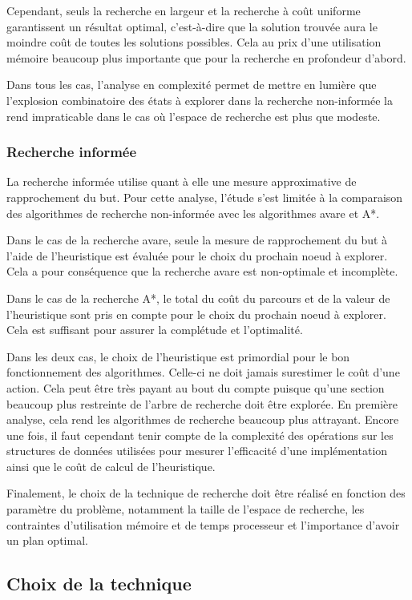 \documentclass[12pt,english,frenchb,letterpaper]{article}
\begin{document}
Cependant, seuls la recherche en largeur et la recherche à coût uniforme garantissent un résultat optimal, c'est-à-dire que la solution trouvée aura le moindre coût de toutes les solutions possibles. Cela au prix d'une utilisation mémoire beaucoup plus importante que pour la recherche en profondeur d'abord.

Dans tous les cas, l'analyse en complexité permet de mettre en lumière que l'explosion combinatoire des états à explorer dans la recherche non-informée la rend impraticable dans le cas où l'espace de recherche est plus que modeste.  

\subsubsection{Recherche informée}
La recherche informée utilise quant à elle une mesure approximative de rapprochement du but. Pour cette analyse, l'étude s'est limitée à la comparaison des algorithmes de recherche non-informée avec les algorithmes avare et A*.

Dans le cas de la recherche avare, seule la mesure de rapprochement du but à l'aide de l'heuristique est évaluée pour le choix du prochain noeud à explorer.  Cela a pour conséquence que la recherche avare est non-optimale et incomplète.

Dans le cas de la recherche A*, le total du coût du parcours et de la valeur de l'heuristique sont pris en compte pour le choix du prochain noeud à explorer.  Cela est suffisant pour assurer la complétude et l'optimalité.

Dans les deux cas, le choix de l'heuristique est primordial pour le bon fonctionnement des algorithmes.  Celle-ci ne doit jamais surestimer le coût d'une action.  Cela peut être très payant au bout du compte puisque qu'une section beaucoup plus restreinte de l'arbre de recherche doit être explorée.  En première analyse, cela rend les algorithmes de recherche beaucoup plus attrayant.  Encore une fois, il faut cependant tenir compte de la complexité des opérations sur les structures de données utilisées pour mesurer l'efficacité d'une implémentation ainsi que le coût de calcul de l'heuristique.  

Finalement, le choix de la technique de recherche doit être réalisé en fonction des paramètre du problème, notamment la taille de l'espace de recherche, les contraintes d'utilisation mémoire et de temps processeur et l'importance d'avoir un plan optimal. 


\subsection{Choix de la technique}
\end{document}
